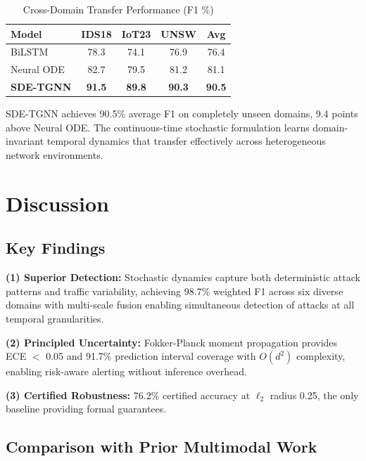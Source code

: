 \documentclass[10pt,journal,compsoc]{IEEEtran}
\begin{document}
\begin{table}[!t]
\centering
\caption{Cross-Domain Transfer Performance (F1 \%)}
\label{tab:transfer}
\small
\begin{tabular}{@{}lcccc@{}}
\toprule
\textbf{Model} & \textbf{IDS18} & \textbf{IoT23} & \textbf{UNSW} & \textbf{Avg} \\
\midrule
BiLSTM & 78.3 & 74.1 & 76.9 & 76.4 \\
Neural ODE & 82.7 & 79.5 & 81.2 & 81.1 \\
\textbf{SDE-TGNN} & \textbf{91.5} & \textbf{89.8} & \textbf{90.3} & \textbf{90.5} \\
\bottomrule
\end{tabular}
\end{table}

SDE-TGNN achieves 90.5\% average F1 on completely unseen domains, 9.4 points above Neural ODE. The continuous-time stochastic formulation learns domain-invariant temporal dynamics that transfer effectively across heterogeneous network environments.

\vspace{-0.2cm}
\section{Discussion}
\label{sec:discussion}

\vspace{-0.2cm}
\subsection{Key Findings}

\textbf{(1) Superior Detection:} Stochastic dynamics capture both deterministic attack patterns and traffic variability, achieving 98.7\% weighted F1 across six diverse domains with multi-scale fusion enabling simultaneous detection of attacks at all temporal granularities.

\textbf{(2) Principled Uncertainty:} Fokker-Planck moment propagation provides ECE $<$ 0.05 and 91.7\% prediction interval coverage with $O(d^2)$ complexity, enabling risk-aware alerting without inference overhead.

\textbf{(3) Certified Robustness:} 76.2\% certified accuracy at $\ell_2$ radius 0.25, the only baseline providing formal guarantees.

\vspace{-0.2cm}
\subsection{Comparison with Prior Multimodal Work}
\end{document}
